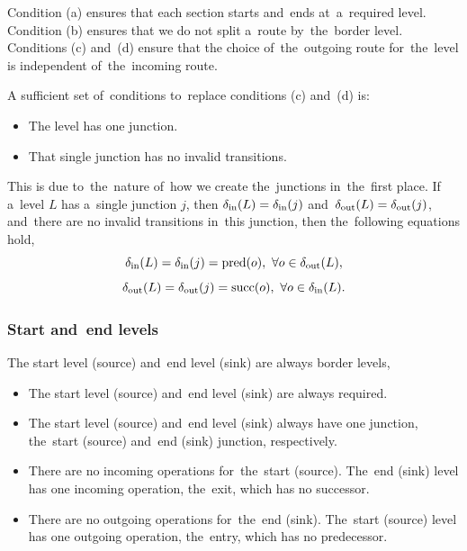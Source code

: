 Condition (a) ensures that each section starts and~ends at~a~required level. Condition (b) ensures that we do not split a~route by~the~border level. Conditions (c) and~(d) ensure that the choice of~the~outgoing route for~the~level is independent of~the~incoming route.

\begin{remark}
A sufficient set of~conditions to~replace conditions (c) and~(d) is:
\begin{itemize}
  \item The level has one junction.
  \item That single junction has no invalid transitions.
\end{itemize}
This is due to~the~nature of~how we create the~junctions in~the~first place. If a~level $L$ has a~single junction $j$, then $\operatorname{\delta_{in}}(L) = \operatorname{\delta_{in}}(j)$ and~$\operatorname{\delta_{out}}(L) = \operatorname{\delta_{out}}(j)$, and~there are no invalid transitions in~this junction, then the~following equations hold,
\begin{equation}
  \operatorname{\delta_{in}}(L) = \operatorname{\delta_{in}}(j) = \mathrm{pred}(o),\ \forall o \in \operatorname{\delta_{out}}(L),
\end{equation}
\begin{equation}
  \operatorname{\delta_{out}}(L) = \operatorname{\delta_{out}}(j) = \mathrm{succ}(o),\ \forall o \in \operatorname{\delta_{in}}(L).
\end{equation}
\end{remark}

\begin{minipage}{\textwidth}
\subsubsection{Start and~end levels}

The start level (source) and~end level (sink) are always border levels,
\begin{itemize}
  \item [(a)] The start level (source) and~end level (sink) are always required.
  \item [(b)] The start level (source) and~end level (sink) always have one junction, the~start (source) and~end (sink) junction, respectively.
  \item [(c)] There are no incoming operations for~the~start (source). The~end (sink) level has one incoming operation, the~exit, which has no successor.
  \item [(d)] There are no outgoing operations for~the~end (sink). The~start (source) level has one outgoing operation, the~entry, which has no predecessor.
\end{itemize}
\end{minipage}

